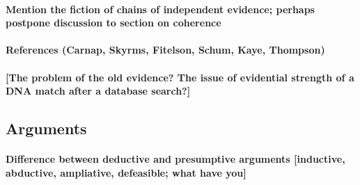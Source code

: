\documentclass[10pt]{article}
\begin{document}
\begin{comment}
Suppose a witness asserts that $F$ in a court of law, denoted by $A_F$. We are now interested in knowing the 
strength of the evidence $A_F$. This depends on specifying the hypothesis of interest.  
Suppose the hypothesis is that F occurred and the witness did not misremember
nor misperceive, that is, $F\wedge C_F$. The alternative 
hypothesis will be that  F did not occur and the witness did misperceive nor misremember, 
that is, $\neg F \wedge \neg C_F$. The likelihood ratio 
of interest is therefore as follows:
%
\[\frac{P(A_F| F, C_F)}{P( A_F|\neg F, \neg C_F)}=\frac{P(A_F| C_F)}{P(A_F| \neg C_F)}\]
%
The equivalence is based on the idea that $A_F$ immediately depends on whether $C_F$ 
but not on whether $F$. We make assertions depending on our cognitive states, for examples, what we believe or not believe 
or whether we have an interest in lying. Whether a certain fact F occurred does not 
have a direct influence on our assertions (if not indirectly through 
our cognitive states). This, at least, is the assumptions 
about our psychology that justifies the equivalence above. 
\end{comment}


\paragraph{Mention the fiction of chains of independent evidence; perhaps postpone discussion to section on coherence}
		
\paragraph{References (Carnap, Skyrms, Fitelson, Schum, Kaye, Thompson)}
		

\paragraph{[The problem of the old evidence? The issue of evidential strength of a DNA match after a database search?]}


\subsection{Arguments}

\paragraph{Difference between deductive and presumptive arguments [inductive, abductive, ampliative, defeasible; what have you]}
\end{document}
